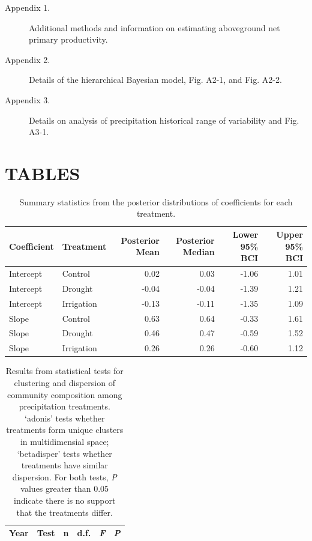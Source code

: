\documentclass[fleqn,10pt,lineno]{wlpeerj} %
\begin{document}
\begin{description}
\item [Appendix 1.] Additional methods and information on estimating aboveground net primary productivity.
\item [Appendix 2.] Details of the hierarchical Bayesian model, Fig. A2-1, and Fig. A2-2.
\item [Appendix 3.] Details on analysis of precipitation historical range of variability and Fig. A3-1.
\end{description}

\newpage{}

\section{TABLES}\label{tables}

\begin{table}[ht]
\centering
\caption{Summary statistics from the posterior distributions of coefficients for each treatment.} 
\begingroup\normalsize
\begin{tabular}{llrrrr}
  \hline
Coefficient & Treatment & Posterior Mean & Posterior Median & Lower 95\% BCI & Upper 95\% BCI \\ 
  \hline
Intercept & Control & 0.02 & 0.03 & -1.06 & 1.01 \\ 
  Intercept & Drought & -0.04 & -0.04 & -1.39 & 1.21 \\ 
  Intercept & Irrigation & -0.13 & -0.11 & -1.35 & 1.09 \\ 
  Slope & Control & 0.63 & 0.64 & -0.33 & 1.61 \\ 
  Slope & Drought & 0.46 & 0.47 & -0.59 & 1.52 \\ 
  Slope & Irrigation & 0.26 & 0.26 & -0.60 & 1.12 \\ 
   \hline
\end{tabular}
\endgroup
\end{table}\begin{table}[ht]
\centering
\caption{Results from statistical tests for clustering and dispersion of community composition among precipitation treatments. `adonis' tests whether treatments form unique clusters in multidimensial space; `betadisper' tests whether treatments have similar dispersion. For both tests, \emph{P} values greater than 0.05 indicate there is no support that the treatments differ.} 
\begingroup\normalsize
\begin{tabular}{rlrrrr}
  \hline
Year & Test & n & d.f. & \emph{F} & \emph{P} \\ 
  \hline

\end{tabular}
\end{table}
\end{document}
